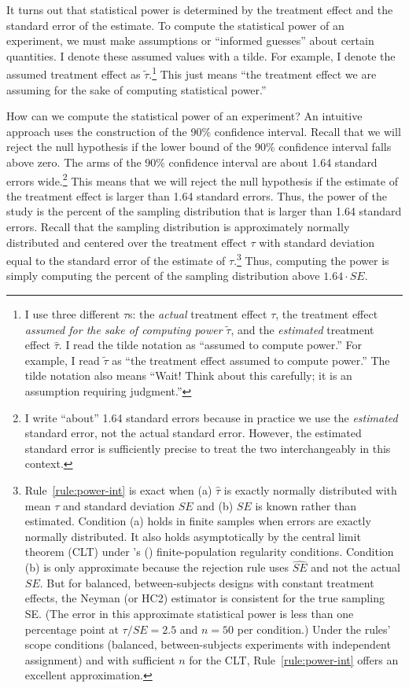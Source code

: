 \documentclass[12pt]{article}
\begin{document}
It turns out that statistical power is determined by the treatment effect and the
standard error of the estimate.
To compute the statistical power of an experiment, we must make assumptions or ``informed guesses'' about certain quantities.
I denote these assumed values with a tilde. For example, I denote the assumed treatment effect as $\widetilde{\tau}$.\footnote{
  I use three different $\tau$s: the \emph{actual} treatment effect $\tau$, the treatment effect \emph{assumed for the sake of computing power} $\widetilde{\tau}$, and the \emph{estimated} treatment effect $\widehat{\tau}$.
  I read the tilde notation as ``assumed to compute power.''
  For example, I read $\widetilde{\tau}$ as ``the treatment effect assumed
  to compute power.''
  The tilde notation also means ``Wait! Think about this carefully; it is an assumption requiring judgment.''}
This just means ``the treatment effect we are assuming for the sake of computing statistical power.''

How can we compute the statistical power of an experiment?
An intuitive approach uses the construction of the 90\% confidence interval.
Recall that we will reject the null hypothesis if the lower bound of the 90\% confidence interval falls above zero.
The arms of the 90\% confidence interval are about 1.64 standard errors wide.\footnote{
  I write ``about'' 1.64 standard errors because in practice we use the \emph{estimated} standard error, not the actual standard error.
  However, the estimated standard error is sufficiently precise to treat
  the two interchangeably in this context.
  }
This means that we will reject the null hypothesis if the estimate of the treatment effect is larger than 1.64 standard errors.
Thus, the power of the study is the percent of the sampling distribution that is larger than 1.64 standard errors.
Recall that the sampling distribution is approximately normally distributed and centered over the treatment effect $\tau$ with standard deviation equal to the standard error of the estimate of $\tau$.\footnote{
  Rule~\ref{rule:power-int} is exact when (a) $\widehat{\tau}$ is exactly normally distributed with mean $\tau$ and standard deviation $SE$ and (b) $SE$ is known rather than estimated. Condition (a) holds in finite samples when errors are exactly normally distributed.
  It also holds asymptotically by the central limit theorem (CLT) under \citeauthor{Li2017}'s (\citeyear{Li2017}) finite-population regularity conditions.
  Condition (b) is only approximate because the rejection rule uses $\widehat{SE}$ and not the actual $SE$.
  But for balanced, between-subjects designs with constant treatment effects, the Neyman (or HC2) estimator is consistent for the true sampling SE.
  (The error in this approximate statistical power is less than one percentage point at $\tau/SE = 2.5$ and $n = 50$ per condition.)
  Under the rules' scope conditions (balanced, between-subjects experiments with independent assignment) and with sufficient $n$ for the CLT, Rule~\ref{rule:power-int} offers an excellent approximation.
  }
Thus, computing the power is simply computing the percent of the sampling distribution above $1.64 \cdot SE$.
\end{document}
